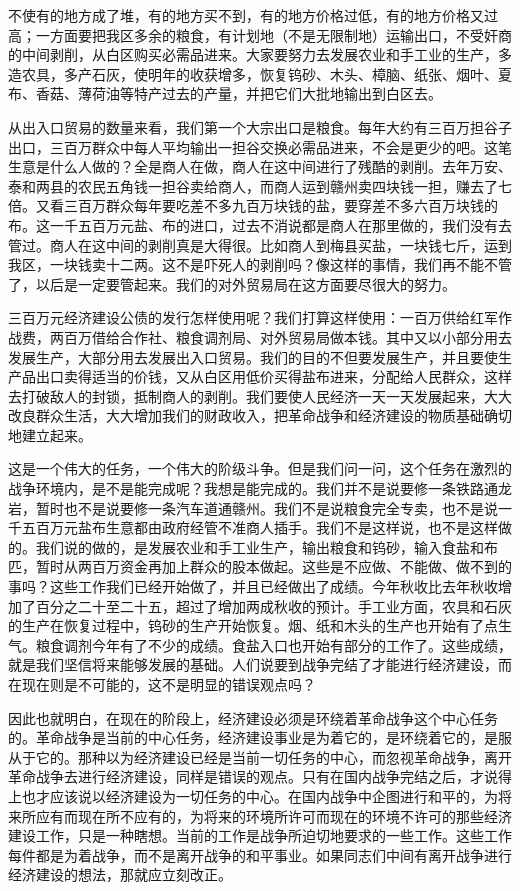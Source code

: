 不使有的地方成了堆，有的地方买不到，有的地方价格过低，有的地方价格又过高；一方面要把我区多余的粮食，有计划地（不是无限制地）运输出口，不受奸商的中间剥削，从白区购买必需品进来。大家要努力去发展农业和手工业的生产，多造农具，多产石灰，使明年的收获增多，恢复钨砂、木头、樟脑、纸张、烟叶、夏布、香菇、薄荷油等特产过去的产量，并把它们大批地输出到白区去。

从出入口贸易的数量来看，我们第一个大宗出口是粮食。每年大约有三百万担谷子出口，三百万群众中每人平均输出一担谷交换必需品进来，不会是更少的吧。这笔生意是什么人做的？全是商人在做，商人在这中间进行了残酷的剥削。去年万安、泰和两县的农民五角钱一担谷卖给商人，而商人运到赣州卖四块钱一担，赚去了七倍。又看三百万群众每年要吃差不多九百万块钱的盐，要穿差不多六百万块钱的布。这一千五百万元盐、布的进口，过去不消说都是商人在那里做的，我们没有去管过。商人在这中间的剥削真是大得很。比如商人到梅县买盐，一块钱七斤，运到我区，一块钱卖十二两。这不是吓死人的剥削吗？像这样的事情，我们再不能不管了，以后是一定要管起来。我们的对外贸易局在这方面要尽很大的努力。

三百万元经济建设公债的发行怎样使用呢？我们打算这样使用：一百万供给红军作战费，两百万借给合作社、粮食调剂局、对外贸易局做本钱。其中又以小部分用去发展生产，大部分用去发展出入口贸易。我们的目的不但要发展生产，并且要使生产品出口卖得适当的价钱，又从白区用低价买得盐布进来，分配给人民群众，这样去打破敌人的封锁，抵制商人的剥削。我们要使人民经济一天一天发展起来，大大改良群众生活，大大增加我们的财政收入，把革命战争和经济建设的物质基础确切地建立起来。

这是一个伟大的任务，一个伟大的阶级斗争。但是我们问一问，这个任务在激烈的战争环境内，是不是能完成呢？我想是能完成的。我们并不是说要修一条铁路通龙岩，暂时也不是说要修一条汽车道通赣州。我们不是说粮食完全专卖，也不是说一千五百万元盐布生意都由政府经管不准商人插手。我们不是这样说，也不是这样做的。我们说的做的，是发展农业和手工业生产，输出粮食和钨砂，输入食盐和布匹，暂时从两百万资金再加上群众的股本做起。这些是不应做、不能做、做不到的事吗？这些工作我们已经开始做了，并且已经做出了成绩。今年秋收比去年秋收增加了百分之二十至二十五，超过了增加两成秋收的预计。手工业方面，农具和石灰的生产在恢复过程中，钨砂的生产开始恢复。烟、纸和木头的生产也开始有了点生气。粮食调剂今年有了不少的成绩。食盐入口也开始有部分的工作了。这些成绩，就是我们坚信将来能够发展的基础。人们说要到战争完结了才能进行经济建设，而在现在则是不可能的，这不是明显的错误观点吗？

因此也就明白，在现在的阶段上，经济建设必须是环绕着革命战争这个中心任务的。革命战争是当前的中心任务，经济建设事业是为着它的，是环绕着它的，是服从于它的。那种以为经济建设已经是当前一切任务的中心，而忽视革命战争，离开革命战争去进行经济建设，同样是错误的观点。只有在国内战争完结之后，才说得上也才应该说以经济建设为一切任务的中心。在国内战争中企图进行和平的，为将来所应有而现在所不应有的，为将来的环境所许可而现在的环境不许可的那些经济建设工作，只是一种瞎想。当前的工作是战争所迫切地要求的一些工作。这些工作每件都是为着战争，而不是离开战争的和平事业。如果同志们中间有离开战争进行经济建设的想法，那就应立刻改正。


